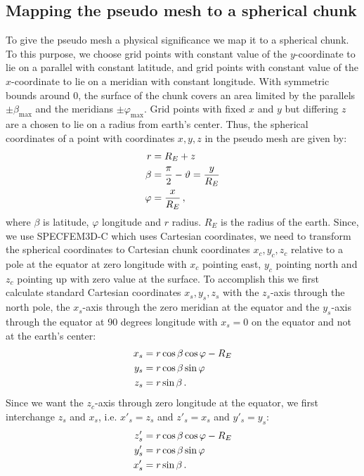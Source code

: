 \subsection{Mapping the pseudo mesh to a spherical chunk}
%
To give the pseudo mesh a physical significance we map it to a spherical chunk. To this purpose, we choose grid points with constant value of the $y$-coordinate to lie on a parallel with constant latitude, and grid points with constant value of the $x$-coordinate to lie on a meridian with constant longitude. With symmetric bounds around $0$, the surface of the chunk covers an area limited by the parallels $\pm\beta_\mathrm{max}$ and the meridians $\pm\varphi_\mathrm{max}$. Grid points with fixed $x$ and $y$ but differing $z$ are a chosen to lie on a radius from earth's center. Thus, the spherical coordinates of a point with coordinates $x,y,z$ in the pseudo mesh are given by:
\begin{align}
	r &= R_E+z \notag \\
	\beta &= \frac{\pi}{2}-\vartheta = \frac{y}{R_E} \notag \\
	\varphi &= \frac{x}{R_E} \,,
\end{align}
%
where $\beta$ is latitude, $\varphi$ longitude and $r$ radius. $R_E$ is the radius of the earth. Since, we use SPECFEM3D-C which uses Cartesian coordinates, we need to transform the spherical coordinates to Cartesian chunk coordinates $x_c,y_c,z_c$ relative to a pole at the equator at zero longitude with $x_c$ pointing east, $y_c$ pointing north and $z_c$ pointing up with zero value at the surface. To accomplish this we first calculate standard Cartesian coordinates $x_s,y_s,z_s$ with the $z_s$-axis through the north pole, the $x_s$-axis through the zero meridian at the equator and the $y_s$-axis through the equator at 90 degrees longitude with $x_s=0$ on the equator and not at the earth's center:
\begin{align}
	x_s & = r\cos\beta\cos\varphi-R_E \notag \\
	y_s & = r\cos\beta\sin\varphi \notag \\
	z_s & = r\sin\beta \,.
\end{align}
Since we want the $z_c$-axis through zero longitude at the equator, we first interchange $z_s$ and $x_s$, i.e. $x'_s = z_s$ and $z'_s = x_s$ and $y'_s = y_s$:
%
\begin{align}
	z'_s & = r\cos\beta\cos\varphi-R_E \notag \\
	y'_s & = r\cos\beta\sin\varphi \notag \\
	x'_s & = r\sin\beta \,.
\end{align}
